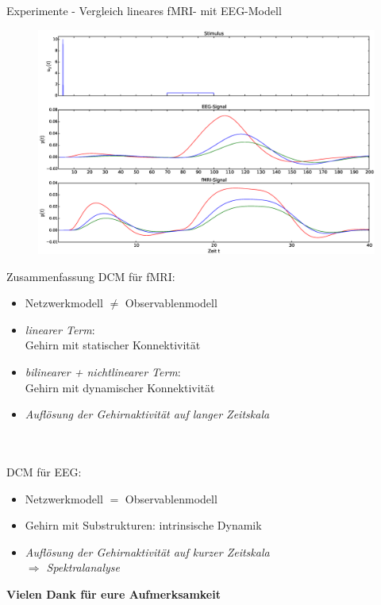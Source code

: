 \documentclass{beamer}
\begin{document}
\begin{frame}{Experimente - Vergleich lineares fMRI- mit EEG-Modell}
\begin{figure}
\centering
\includegraphics[scale=0.25]{res/hemo-EEG-vergleich3.eps}
\end{figure}
\end{frame}

\begin{frame}{Zusammenfassung}
DCM für fMRI:
\begin{itemize}
\item Netzwerkmodell $\neq$ Observablenmodell
\item \textit{linearer Term}:\\ Gehirn mit statischer Konnektivität
\item \textit{bilinearer + nichtlinearer Term}:\\ Gehirn mit dynamischer Konnektivität
\item \textit{Auflösung der Gehirnaktivität auf langer Zeitskala}
\end{itemize}
\pause
~\\~\\
DCM für EEG:
\begin{itemize}
\item Netzwerkmodell $=$ Observablenmodell
\item Gehirn mit Substrukturen: intrinsische Dynamik
\item \textit{Auflösung der Gehirnaktivität auf kurzer Zeitskala\\ $\Rightarrow$ Spektralanalyse} 
\end{itemize}
\end{frame}

\begin{frame}
\centering
\begin{Large}
\textbf{Vielen Dank für eure Aufmerksamkeit}
\end{Large}
\end{frame}
\end{document}
